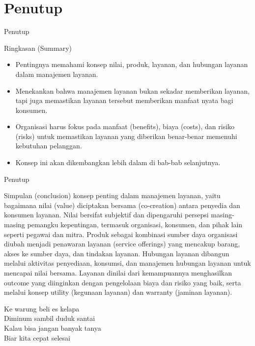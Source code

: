 \documentclass[aspectratio=179]{beamer}
\begin{document}
\section{Penutup}
\begin{frame}{Penutup}
    \begin{block}{Ringkasan (Summary)}
        \begin{itemize}
            \item Pentingnya memahami konsep nilai, produk, layanan, dan hubungan layanan dalam manajemen layanan.
            \item Menekankan bahwa manajemen layanan bukan sekadar memberikan layanan, tapi juga memastikan layanan tersebut memberikan manfaat nyata bagi konsumen.
            \item Organisasi harus fokus pada manfaat (benefits), biaya (costs), dan risiko (risks) untuk memastikan layanan yang diberikan benar-benar memenuhi kebutuhan pelanggan.
            \item Konsep ini akan dikembangkan lebih dalam di bab-bab selanjutnya.
        \end{itemize}
    \end{block}
\end{frame}

\begin{frame}{Penutup}
    \begin{block}{Simpulan (conclusion)}
        konsep penting dalam manajemen layanan, yaitu bagaimana nilai (value) diciptakan bersama (co-creation) antara penyedia dan konsumen layanan. Nilai bersifat subjektif dan dipengaruhi persepsi masing-masing pemangku kepentingan, termasuk organisasi, konsumen, dan pihak lain seperti pegawai dan mitra. Produk sebagai kombinasi sumber daya organisasi diubah menjadi penawaran layanan (service offerings) yang mencakup barang, akses ke sumber daya, dan tindakan layanan. Hubungan layanan dibangun melalui aktivitas penyediaan, konsumsi, dan manajemen hubungan layanan untuk mencapai nilai bersama. Layanan dinilai dari kemampuannya menghasilkan outcome yang diinginkan dengan pengelolaan biaya dan risiko yang baik, serta melalui konsep utility (kegunaan layanan) dan warranty (jaminan layanan).


    \end{block}
\end{frame}

\begin{frame}[standout]
  Ke warung beli es kelapa \\
  Diminum sambil duduk santai \\
  Kalau bisa jangan banyak tanya \\
  Biar kita cepat selesai
\end{frame}

\end{document}
